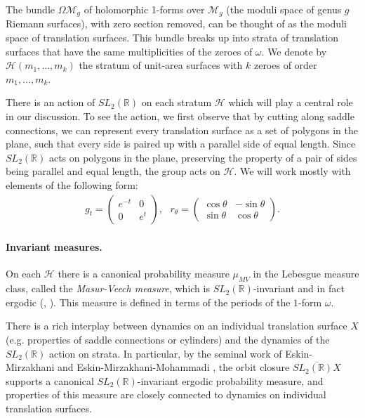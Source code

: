 \documentclass{article}
\theoremstyle{definition}
\begin{document}
The bundle $\Omega \mathcal{M}_g$ of holomorphic 1-forms over $\mathcal{M}_g$ (the moduli space of genus $g$ Riemann surfaces), with zero section removed, can be thought of as the moduli space of translation surfaces.  This bundle breaks up into strata of translation surfaces that have the same multiplicities of the zeroes of $\omega$.  We denote by $\mathcal{H}(m_1,\dots,m_k)$ the stratum of unit-area surfaces with $k$ zeroes of order $m_1,\ldots,m_k$. 

There is an action of $SL_2(\mathbb{R})$ on each stratum $\mathcal{H}$ which will play a central role in our discussion.  To see the action, we first observe that by cutting along saddle connections, we can represent every translation surface as a set of polygons in the plane, such that every side is paired up with a parallel side of equal length.  Since $SL_2(\mathbb{R})$ acts on polygons in the plane, preserving the property of a pair of sides being parallel and equal length, the group acts on $\mathcal{H}$.  We will work mostly with elements of the following form:
\begin{eqnarray*}
  g_t =
  \left(\begin{matrix}
    e^{-t} & 0 \\
    0 & e^t
  \end{matrix}\right), \text{  \ \    } r_{\theta} = \left(
        \begin{matrix}
          \cos \theta & -\sin\theta \\
          \sin \theta & \cos\theta
        \end{matrix}\right).
\end{eqnarray*}
 

\paragraph{Invariant measures.} On each $\mathcal{H}$ there is a canonical probability measure $\mu_{MV}$ in the Lebesgue measure class, called the \emph{Masur-Veech measure}, which is $SL_2(\mathbb{R})$-invariant and in fact ergodic (\cite{masur1982}, \cite{veech1982}).  This measure is defined in terms of the periods of the $1$-form $\omega$.  

There is a rich interplay between dynamics on an individual translation surface $X$ (e.g. properties of saddle connections or cylinders) and the dynamics of the $SL_2(\mathbb{R})$ action on strata.  In particular, by the seminal work of Eskin-Mirzakhani \cite{em2013} and Eskin-Mirzakhani-Mohammadi \cite{emm2015}, the orbit closure $\overline{SL_2(\mathbb{R})X}$ supports a canonical $SL_2(\mathbb{R})$-invariant ergodic probability measure, and properties of this measure are closely connected to dynamics on individual translation surfaces.  
\end{document}
